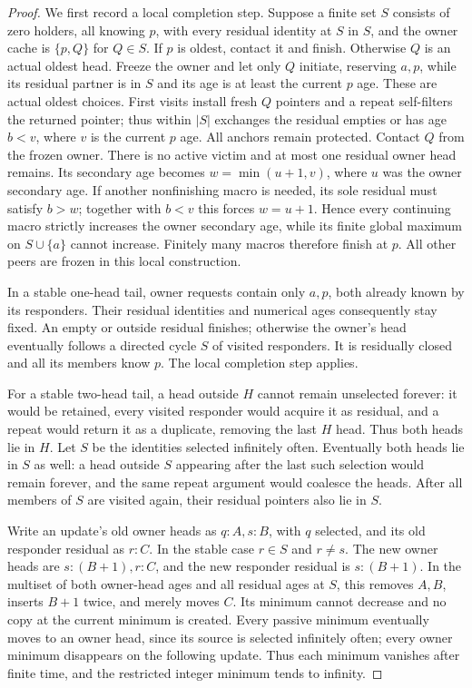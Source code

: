 \documentclass[11pt]{article}
\begin{document}
\begin{proof}
We first record a local completion step. Suppose a finite
set $S$ consists of zero holders, all knowing $p$, with
every residual identity at $S$ in $S$, and the owner cache
is $\{p,Q\}$ for $Q\in S$. If $p$ is oldest, contact it
and finish. Otherwise $Q$ is an actual oldest head. Freeze
the owner and let only $Q$ initiate, reserving $a,p$, while its residual partner
is in $S$ and its age is at least the current $p$ age.
These are actual oldest choices. First visits install fresh
$Q$ pointers and a repeat self-filters the returned pointer;
thus within $|S|$ exchanges the residual empties or has age
$b<v$, where $v$ is the current $p$ age. All anchors remain
protected. Contact $Q$ from the frozen owner. There is no
active victim and at most one residual owner head remains.
Its secondary age becomes $w=\min(u+1,v)$, where $u$ was
the owner secondary age. If another nonfinishing macro is
needed, its sole residual must satisfy $b>w$; together with
$b<v$ this forces $w=u+1$. Hence every continuing macro
strictly increases the owner secondary age, while its finite
global maximum on $S\cup\{a\}$ cannot increase. Finitely
many macros therefore finish at $p$. All other peers are
frozen in this local construction.

In a stable one-head tail, owner requests contain only
$a,p$, both already known by its responders. Their residual
identities and numerical ages consequently stay fixed. An
empty or outside residual finishes; otherwise the owner's
head eventually follows a directed cycle $S$ of visited
responders. It is residually closed and all its members
know $p$. The local completion step applies.

For a stable two-head tail, a head outside $H$ cannot remain
unselected forever: it would be retained, every visited
responder would acquire it as residual, and a repeat would
return it as a duplicate, removing the last $H$ head. Thus
both heads lie in $H$. Let $S$ be the identities selected
infinitely often. Eventually both heads lie in $S$ as well:
a head outside $S$ appearing after the last such selection
would remain forever, and the same repeat argument would
coalesce the heads. After all members of $S$ are visited
again, their residual pointers also lie in $S$.

Write an update's old owner heads as $q:A,s:B$, with $q$
selected, and its old responder residual as $r:C$. In the
stable case $r\in S$ and $r\ne s$. The new owner heads are
$s:(B+1),r:C$, and the new responder residual is $s:(B+1)$.
In the multiset of both owner-head ages and all residual
ages at $S$, this removes $A,B$, inserts $B+1$ twice, and
merely moves $C$. Its minimum cannot decrease and no copy
at the current minimum is created. Every passive minimum
eventually moves to an owner head, since its source is
selected infinitely often; every owner minimum disappears
on the following update. Thus each minimum vanishes after
finite time, and the restricted integer minimum tends to
infinity.


\end{proof}
\end{document}
